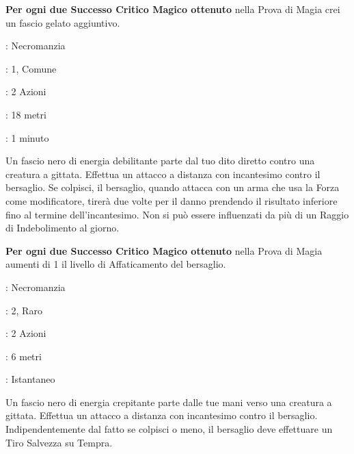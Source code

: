 \begin{multicols}{2}
\textbf{Per ogni due Successo Critico Magico ottenuto} nella Prova di Magia crei un fascio gelato aggiuntivo.

\noindent\colorbox{OBSSgold!10}{
\begin{minipage}{0.95\linewidth}
\begin{description}[noitemsep, topsep=0pt, parsep=0pt, partopsep=0pt, leftmargin=0cm, labelwidth=1.3cm]
	\item[\textbf{Lista}]: Necromanzia
	\item[\textbf{Livello}]: 1, Comune
	\item[\textbf{Lancio}]: 2 Azioni
	\item[\textbf{Gittata}]: 18 metri
	\item[\textbf{Durata}]: 1 minuto
\end{description}
\end{minipage}}\smallskip

Un fascio nero di energia debilitante parte dal tuo dito diretto contro una creatura a gittata. Effettua un attacco a distanza con incantesimo contro il bersaglio. Se colpisci, il bersaglio, quando attacca con un arma che usa la Forza come modificatore, tirerà due volte per il danno prendendo il risultato inferiore fino al termine dell'incantesimo. Non si può essere influenzati da più di un Raggio di Indebolimento al giorno.

\textbf{Per ogni due Successo Critico Magico ottenuto} nella Prova di Magia aumenti di 1 il livello di Affaticamento del bersaglio.

\noindent\colorbox{OBSSgold!10}{
\begin{minipage}{0.95\linewidth}
\begin{description}[noitemsep, topsep=0pt, parsep=0pt, partopsep=0pt, leftmargin=0cm, labelwidth=1.3cm]
	\item[\textbf{Lista}]: Necromanzia
	\item[\textbf{Livello}]: 2, Raro
	\item[\textbf{Lancio}]: 2 Azioni
	\item[\textbf{Gittata}]: 6 metri
	\item[\textbf{Durata}]: Istantaneo
\end{description}
\end{minipage}}\smallskip

Un fascio nero di energia crepitante parte dalle tue mani verso una creatura a gittata. Effettua un attacco a distanza con incantesimo contro il bersaglio. Indipendentemente dal fatto se colpisci o meno, il bersaglio deve effettuare un Tiro Salvezza su Tempra.


\end{multicols}
